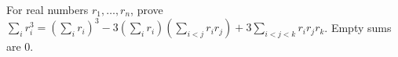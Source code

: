 For real numbers $r_1,\ldots,r_n$, prove $\displaystyle\sum_i r_i^3=(\sum_i r_i)^3-3(\sum_i r_i)(\sum_{i<j}r_ir_j)+3\sum_{i<j<k}r_ir_jr_k$. Empty sums are 0.
